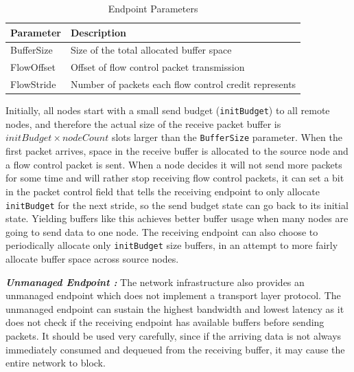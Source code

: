 \begin{table}[b]
	\begin{tabular}{l | l}
		Parameter & Description \\
		\hline
		BufferSize & Size of the total allocated buffer space\\
		FlowOffset & Offset of flow control packet transmission\\
		FlowStride & Number of packets each flow control credit represents\\
		\hline
	\end{tabular}
	\caption{Endpoint Parameters}
	\label{tab:transportparamter}
\end{table}

Initially, all nodes start with a small send budget (\texttt{initBudget}) to all
remote nodes, and therefore the actual size of the receive packet buffer is
$initBudget \times nodeCount$ slots larger than the \texttt{BufferSize}
parameter. When the first packet arrives, space in the receive buffer is
allocated to the source node and a flow control packet is sent. When a node
decides it will not send more packets for some time and will rather stop
receiving flow control packets, it can set a bit in the packet control field
that tells the receiving endpoint to only allocate \texttt{initBudget} for the
next stride, so the send budget state can go back to its initial state. Yielding
buffers like this achieves better buffer usage when many nodes are going to send
data to one node. The receiving endpoint can also choose to periodically
allocate only \texttt{initBudget} size buffers, in an attempt to more fairly
allocate buffer space across source nodes.


\emph{\bf{Unmanaged Endpoint :}}
The network infrastructure also provides an unmanaged endpoint which does not
implement a transport layer protocol.  The unmanaged endpoint can sustain the
highest bandwidth and lowest latency as it does not check if the receiving
endpoint has available buffers before sending packets. It should be used very
carefully, since if the arriving data is not always immediately consumed and
dequeued from the receiving buffer, it may cause the entire network to block. 





